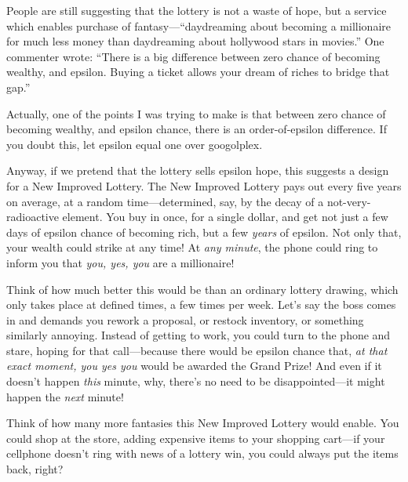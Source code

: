\myendsectiontext


{
 People are still suggesting that the lottery is not a waste of
hope, but a service which enables purchase of
fantasy---``daydreaming about becoming a millionaire
for much less money than daydreaming about hollywood stars in
movies.'' One commenter wrote:
``There is a big difference between zero chance of
becoming wealthy, and epsilon. Buying a ticket allows your dream of
riches to bridge that gap.'' }

{
 Actually, one of the points I was trying to make is that between
zero chance of becoming wealthy, and epsilon chance, there is an
order-of-epsilon difference. If you doubt this, let epsilon equal one
over googolplex.}

{
 Anyway, if we pretend that the lottery sells epsilon hope, this
suggests a design for a New Improved Lottery. The New Improved Lottery
pays out every five years on average, at a random time---determined,
say, by the decay of a not-very-radioactive element. You buy in once,
for a single dollar, and get not just a few days of epsilon chance of
becoming rich, but a few \textit{years} of epsilon. Not only that, your
wealth could strike at any time! At \textit{any minute}, the phone
could ring to inform you that \textit{you, yes, you} are a
millionaire!}

{
 Think of how much better this would be than an ordinary lottery
drawing, which only takes place at defined times, a few times per week.
Let's say the boss comes in and demands you rework a
proposal, or restock inventory, or something similarly annoying.
Instead of getting to work, you could turn to the phone and stare,
hoping for that call---because there would be epsilon chance that,
\textit{at that exact moment, you yes you} would be awarded the Grand
Prize! And even if it doesn't happen \textit{this}
minute, why, there's no need to be disappointed---it
might happen the \textit{next} minute!}

{
 Think of how many more fantasies this New Improved Lottery would
enable. You could shop at the store, adding expensive items to your
shopping cart---if your cellphone doesn't ring with
news of a lottery win, you could always put the items back, right?}

